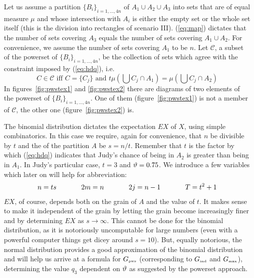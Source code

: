 \documentclass[12pt]{article}
\begin{document}
Let us assume a partition $\{B_{i}\}_{i=1,{\ldots},4n}$ of
$A_{1}\cup{}A_{2}\cup{}A_{3}$ into sets that are of equal measure
$\mu$ and whose intersection with $A_{i}$ is either the empty set or
the whole set itself (this is the division into rectangles of scenario
III). ({\ref{eq:map}}) dictates that the number of sets covering
$A_{3}$ equals the number of sets covering $A_{1}\cup{}A_{2}$. For
convenience, we assume the number of sets covering $A_{1}$ to be $n$.
Let $\mathcal{C}$, a subset of the powerset of
$\{B_{i}\}_{i=1,{\ldots},4n}$, be the collection of sets which agree
with the constraint imposed by ({\ref{eq:hdq}}), i.e.\
\begin{displaymath}
  C\in\mathcal{C}\mbox{ iff }C=\{C_{j}\}\mbox{ and }t\mu\left(\bigcup{}C_{j}\cap{}A_{1}\right)=\mu\left(\bigcup{}C_{j}\cap{}A_{2}\right)
\end{displaymath}
In figures~\ref{fig:pwstex1} and \ref{fig:pwstex2} there are diagrams
of two elements of the powerset of $\{B_{i}\}_{i=1,{\ldots},4n}$. One
of them (figure~\ref{fig:pwstex1}) is not a member of $\mathcal{C}$,
the other one (figure~\ref{fig:pwstex2}) is.

The binomial distribution dictates the expectation $EX$ of $X$, using
simple combinatorics. In this case we require, again for convenience,
that $n$ be divisible by $t$ and the \qnull{grain} of the partition
$A$ be $s=n/t$. Remember that $t$ is the factor by which
({\ref{eq:hdq}}) indicates that Judy's chance of being in $A_{2}$ is
greater than being in $A_{1}$. In Judy's particular case, $t=3$ and
${\vartheta}=0.75$. We introduce a few variables which later on will help
for abbreviation:
\begin{displaymath}
n=ts\hspace{.5in}
2m=n\hspace{.5in}
2j=n-1\hspace{.5in}
{T}=t^{2}+1
\end{displaymath}
$EX$, of course, depends both on the grain of $A$ and the value of
$t$. It makes sense to make it independent of the grain by letting the
grain become increasingly finer and by determining $EX$ as
$s\rightarrow\infty$. This cannot be done for the binomial
distribution, as it is notoriously uncomputable for large numbers
(even with a powerful computer things get dicey around $s=10$). But,
equally notorious, the normal distribution provides a good
approximation of the binomial distribution and will help us arrive at
a formula for $G_{\mbox{\tiny pws}}$ (corresponding to 
$G_{\mbox{\tiny ind}}$ and $G_{\mbox{\tiny max}}$), determining the value $q_{3}$
dependent on ${\vartheta}$ as suggested by the powerset approach.
\end{document}
